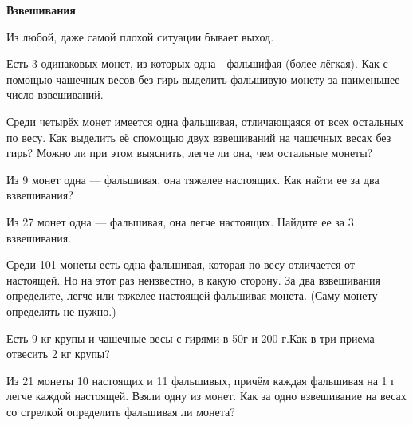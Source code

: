 \centerline{\bf \Huge Взвешивания}

\begin{flushright}
        \scriptsize{Из любой, даже самой плохой ситуации бывает выход.}
\end{flushright}

Есть 3 одинаковых монет, из которых одна - фальшифая (более лёгкая). Как с помощью чашечных весов без гирь выделить фальшивую монету за наименьшее число взвешиваний.

Среди четырёх монет имеется одна фальшивая, отличающаяся от всех остальных по весу. Как выделить её спомощью двух взвешиваний на чашечных весах без гирь? Можно ли при этом выяснить, легче ли она, чем остальные монеты?

 Из 9 монет одна — фальшивая, она тяжелее настоящих. Как найти ее за два взвешивания?

 Из 27 монет одна — фальшивая, она легче настоящих. Найдите ее за 3 взвешивания.


 Среди 101 монеты есть одна фальшивая, которая по весу отличается от настоящей. Но на этот раз неизвестно, в какую сторону. За два взвешивания определите, легче или тяжелее настоящей фальшивая монета. (Саму монету определять не нужно.)


Есть 9 кг крупы и чашечные весы с гирями в 50г и 200 г.Как в три приема отвесить 2 кг крупы?


Из 21 монеты 10 настоящих и 11 фальшивых, причём каждая фальшивая на 1 г легче каждой настоящей. Взяли одну из монет. Как за одно взвешивание на весах со стрелкой определить фальшивая ли монета?


